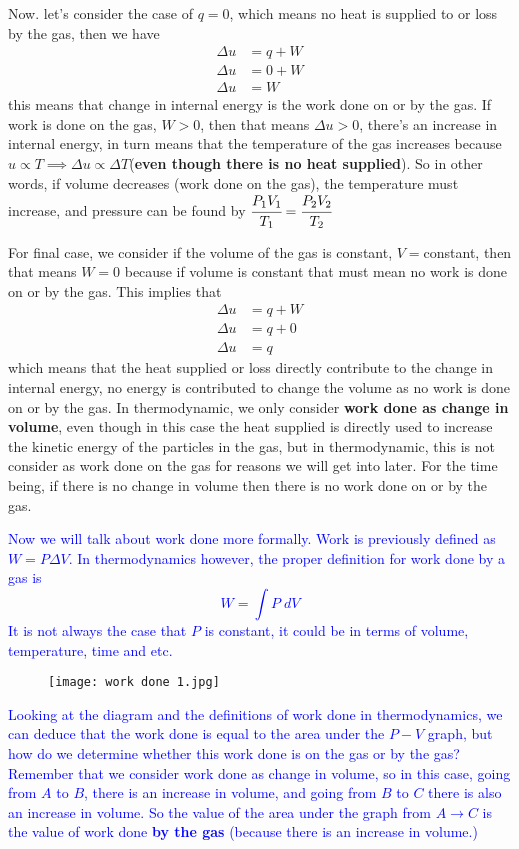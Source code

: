 \documentclass{article}
\begin{document}
Now. let's consider the case of $q=0$, which means no heat is supplied to or loss by the gas, then we have 
\begin{align*}
    \Delta u&=q+W\\ 
    \Delta u&=0+W\\
    \Delta u&=W
\end{align*}
this means that change in internal energy is the work done on or by the gas. If work is done on the gas, $W>0$, then that means $\Delta u>0$, there's an increase in internal energy, in turn means that the temperature of the gas increases because $u\propto T\implies \Delta u\propto\Delta T$(\textbf{even though there is no heat supplied}). So in other words, if volume decreases (work done on the gas), the temperature must increase, and pressure can be found by $\cfrac{P_1V_1}{T_1}=\cfrac{P_2V_2}{T_2}$

For final case, we consider if the volume of the gas is constant, $V=$constant, then that means $W=0$ because if volume is constant that must mean no work is done on or by the gas. This implies that
\begin{align*}
    \Delta u&=q+W\\ 
    \Delta u&=q+0 \\ 
    \Delta u&=q
\end{align*}
which means that the heat supplied or loss directly contribute to the change in internal energy, no energy is contributed to change the volume as no work is done on or by the gas. In thermodynamic, we only consider \textbf{work done as change in volume}, even though in this case the heat supplied is directly used to increase the kinetic energy of the particles in the gas, but in thermodynamic, this is not consider as work done on the gas for reasons we will get into later. For the time being, if there is no change in volume then there is no work done on or by the gas.

\textcolor{blue}{Now we will talk about work done more formally. Work is previously defined as $W=P\Delta V$. In thermodynamics however, the proper definition for work done by a gas is
$$W=\int P\;dV$$
}
\textcolor{blue}{It is not always the case that $P$ is constant, it could be in terms of volume, temperature, time and etc.}
\begin{figure}[H]
    \centering
    \texttt{[image: work done 1.jpg]}
\end{figure}
\textcolor{blue}{Looking at the diagram and the definitions of work done in thermodynamics, we can deduce that the work done is equal to the area under the $P-V$ graph, but how do we determine whether this work done is on the gas or by the gas? Remember that we consider work done as change in volume, so in this case, going from $A$ to $B$, there is an increase in volume, and going from $B$ to $C$ there is also an increase in volume. So the value of the area under the graph from $A\to C$ is the value of work done \textbf{by the gas} (because there is an increase in volume.)}
\end{document}
